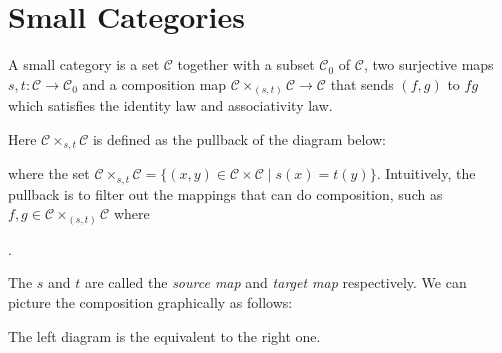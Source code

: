 \documentclass[
	11pt, %
	fleqn, %
	a4paper, %
]{LegrandOrangeBook}
\newcommand{\C}{\mathcal{C}} %
\begin{document}
\section{Small Categories}

\begin{definition}
    A small category is a set $\C$ together with a subset $\C_0$ of $\C$, two surjective maps $s, t : \C \to \C_0$ and a composition map $\C \times_{(s, t)} \C \to \C$ that sends $(f, g)$ to $fg$ which satisfies the identity law and associativity law.
\end{definition}

Here $\C \times_{s, t} \C$ is defined as the pullback of the diagram below:
\begin{center}
\end{center}
where the set $\C \times_{s, t} \C = \{ (x, y) \in \C \times \C \mid s(x) = t(y) \}$. Intuitively, the pullback is to filter out the mappings that can do composition, such as $f, g \in \C \times_{(s, t)} \C$ where .

The $s$ and $t$ are called the \emph{source map} and \emph{target map} respectively. We can picture the composition graphically as follows:
\begin{center}
    \qquad
\end{center}
The left diagram is the equivalent to the right one.
\end{document}
